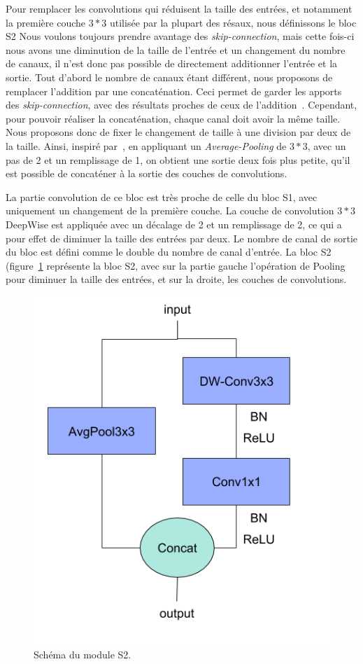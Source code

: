 Pour remplacer les convolutions qui réduisent la taille des entrées, et notamment la première couche $3*3$ utilisée par la plupart des résaux, nous définissons le bloc S2
Nous voulons toujours prendre avantage des \textit{skip-connection}, mais cette fois-ci nous avons une diminution de la taille de l'entrée et un changement du nombre de canaux, il n'est donc pas possible de directement additionner l'entrée et la sortie.
Tout d'abord le nombre de canaux étant différent, nous proposons de remplacer l'addition par une concaténation.
Ceci permet de garder les apports des \textit{skip-connection}, avec des résultats proches de ceux de l'addition~\cite{he2015delving, zhang2017shufflenet, ma2018shufflenet}.
Cependant, pour pouvoir réaliser la concaténation, chaque canal doit avoir la même taille.
Nous proposons donc de fixer le changement de taille à une division par deux de la taille.
Ainsi, inspiré par~\cite{ma2018shufflenet}, en appliquant un \textit{Average-Pooling} de $3*3$, avec un pas de 2 et un remplissage de 1, on obtient une sortie deux fois plus petite, qu'il est possible de concaténer à la sortie des couches de convolutions.

La partie convolution de ce bloc est très proche de celle du bloc S1, avec uniquement un changement de la première couche.
La couche de convolution $3*3$ DeepWise est appliquée avec un décalage de 2 et un remplissage de 2, ce qui a pour effet de diminuer la taille des entrées par deux.
Le nombre de canal de sortie du bloc est défini comme le double du nombre de canal d'entrée.
La bloc S2 (figure~\ref{fig:S2} représente la bloc S2, avec sur la partie gauche l'opération de Pooling pour diminuer la taille des entrées, et sur la droite, les couches de convolutions.

\begin{figure}%
\centering
\includegraphics[width=.6\columnwidth]{figures/stride2.png}%
\caption{Schéma du module S2.}%
\label{fig:S2}%
\end{figure}


